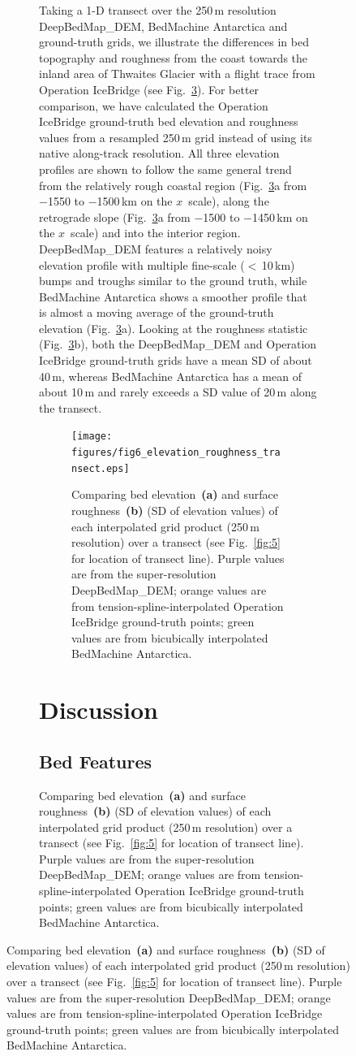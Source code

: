 \documentclass[tc, noline]{copernicus}
\begin{document}
\begin{figure}[t]
\begin{figure}[t]
Taking a 1-D transect over the 250\,\unit{m} resolution DeepBedMap\_DEM, BedMachine Antarctica and ground-truth grids, we illustrate the differences in bed topography and roughness from the coast towards the inland area of Thwaites Glacier with a flight trace from Operation IceBridge (see Fig.~\ref{fig:6}).
For better comparison, we have calculated the Operation IceBridge ground-truth bed elevation and roughness values from a resampled 250\,\unit{m} grid instead of using its native along-track resolution.
All three elevation profiles are shown to follow the same general trend from the relatively rough coastal region (Fig.~\ref{fig:6}a from $-$1550 to $-$1500\,\unit{km} on the $x$~scale), along the retrograde slope (Fig.~\ref{fig:6}a from $-$1500 to $-$1450\,\unit{km} on the $x$~scale) and into the interior region.
DeepBedMap\_DEM features a relatively noisy elevation profile with multiple fine-scale ($<$\,10\,\unit{km}) bumps and troughs similar to the ground truth, while BedMachine Antarctica shows a smoother profile that is almost a moving average of the ground-truth elevation (Fig.~\ref{fig:6}a).
Looking at the roughness statistic (Fig.~\ref{fig:6}b), both the DeepBedMap\_DEM and Operation IceBridge ground-truth grids have a mean SD of about 40\,\unit{m}, whereas BedMachine Antarctica has a mean of about 10\,\unit{m} and rarely exceeds a SD value of 20\,\unit{m} along the transect.

\begin{figure}[t]
  \texttt{[image: figures/fig6\_elevation\_roughness\_transect.eps]}
  \caption{
    Comparing bed elevation~\textbf{(a)} and surface roughness~\textbf{(b)} (SD of elevation values) of each interpolated grid product (250\,\unit{m} resolution) over a transect (see Fig.~\ref{fig:5} for location of transect line).
    Purple values are from the super-resolution DeepBedMap\_DEM;
    orange values are from tension-spline-interpolated Operation IceBridge ground-truth points;
    green values are from bicubically interpolated BedMachine Antarctica.
  }
  \label{fig:6}
\end{figure}


\section{Discussion}

\subsection{Bed Features}


\end{figure}
\end{figure}
\end{document}
